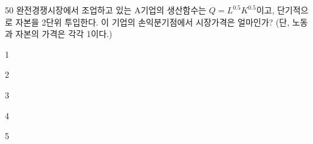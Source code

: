 \begin{question}{50}
완전경쟁시장에서 조업하고 있는 A기업의 생산함수는 $Q=L^{ 0.5 } K^{ 0.5 }$이고, 단기적으로 자본을 2단위 투입한다. 이 기업의 손익분기점에서 시장가격은 얼마인가? (단, 노동과 자본의 가격은 각각 1이다.)
\begin{choices}
  \item 1
  \item 2
  \item 3
  \item 4
  \item 5
\end{choices}
\end{question}
